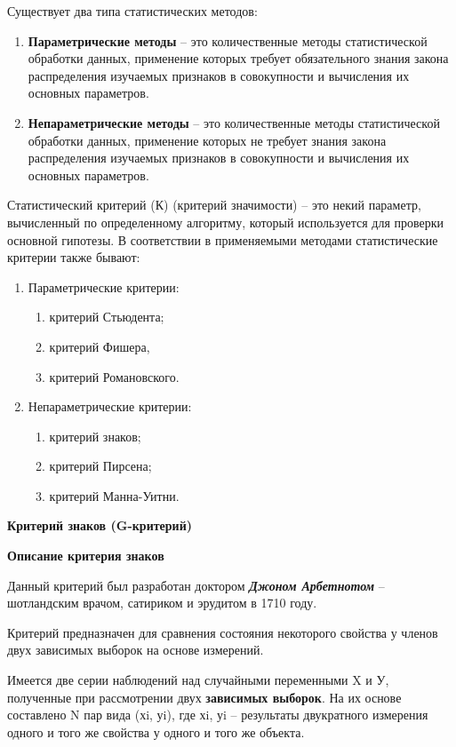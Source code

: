 \documentclass[12pt]{article}
\begin{document}
\medskip
Существует два типа статистических методов:
\begin{enumerate}
    \item \textbf{Параметрические методы} – это количественные методы статистической обработки данных, применение которых требует обязательного знания закона распределения изучаемых признаков в совокупности и вычисления их основных параметров.
    \item \textbf{Непараметрические методы} – это количественные методы статистической обработки данных, применение которых не требует знания закона распределения изучаемых признаков в совокупности и вычисления их основных параметров.
\end{enumerate}
Статистический критерий (К) (критерий значимости) – это некий параметр, вычисленный по определенному алгоритму, который используется для проверки основной гипотезы. В соответствии в применяемыми методами статистические критерии также бывают:
\begin{enumerate}
    \item Параметрические критерии:
    \begin{enumerate}
        \item критерий Стьюдента;
        \item критерий Фишера,
        \item критерий Романовского.
    \end{enumerate}
    \item Непараметрические критерии:
    \begin{enumerate}
        \item критерий знаков;
        \item критерий Пирсена;
        \item критерий Манна-Уитни.
    \end{enumerate}
\end{enumerate}

\textbf{Критерий знаков (G-критерий)}

\medskip
\textbf{Описание критерия знаков}

\medskip
Данный критерий был разработан доктором \textbf{\textit{Джоном Арбетнотом}} – шотландским врачом, сатириком и эрудитом в 1710 году.

Критерий предназначен для сравнения состояния некоторого свойства у членов двух зависимых выборок на основе измерений.

Имеется две серии наблюдений над случайными переменными X и У, полученные при рассмотрении двух \textbf{зависимых выборок}. На их основе составлено N пар вида (хi, уi), где хi, уi – результаты двукратного измерения одного и того же свойства у одного и того же объекта.
\end{document}
